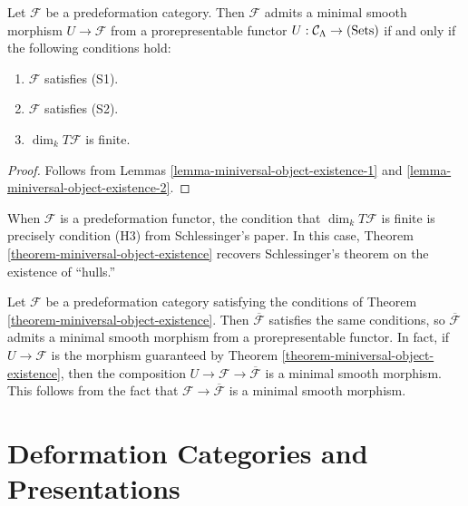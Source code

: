 \begin{theorem}
\label{theorem-miniversal-object-existence}
Let $\mathcal F$ be a predeformation category.  Then $\mathcal F$ admits a 
minimal smooth morphism $U \rightarrow \mathcal F$ from a prorepresentable 
functor $U: \mathcal C_{\Lambda} \rightarrow \textnormal{(Sets)}$ if and only 
if the following conditions hold:
\begin{enumerate}
\item $\mathcal F$ satisfies \textnormal{(S1)}.
\item $\mathcal F$ satisfies \textnormal{(S2)}.
\item $\dim_{k} T\mathcal F$ is finite.
\end{enumerate}
\end{theorem}

\begin{proof}
Follows from Lemmas \ref{lemma-miniversal-object-existence-1} and 
\ref{lemma-miniversal-object-existence-2}.
\end{proof}

\begin{remark}
\label{remark-compare-schlessinger-H3}
When $\mathcal F$ is a predeformation functor, the condition that $\dim_{k} 
T\mathcal F$ is finite is precisely condition (H3) from Schlessinger's paper. 
In this case, Theorem \ref{theorem-miniversal-object-existence} recovers 
Schlessinger's theorem on the existence of ``hulls.''
\end{remark}

\begin{remark}
\label{remark-compose-minimal-into-iso-classes}
Let $\mathcal F$ be a predeformation category satisfying the conditions of 
Theorem \ref{theorem-miniversal-object-existence}. Then $\overline{\mathcal F}$ 
satisfies the same conditions, so $\mathcal \overline{\mathcal F}$ admits a 
minimal smooth morphism from a prorepresentable functor.  In fact, if $U 
\rightarrow \mathcal F$ is the morphism guaranteed by Theorem 
\ref{theorem-miniversal-object-existence}, then the composition $U \rightarrow 
\mathcal F \rightarrow \overline{\mathcal F}$ is a minimal smooth morphism.  
This follows from the fact that $\mathcal F \rightarrow \overline{\mathcal F}$ 
is a minimal smooth morphism.
\end{remark}


\section{Deformation Categories and Presentations}
\label{section-deformation-groupoids-presentations}

